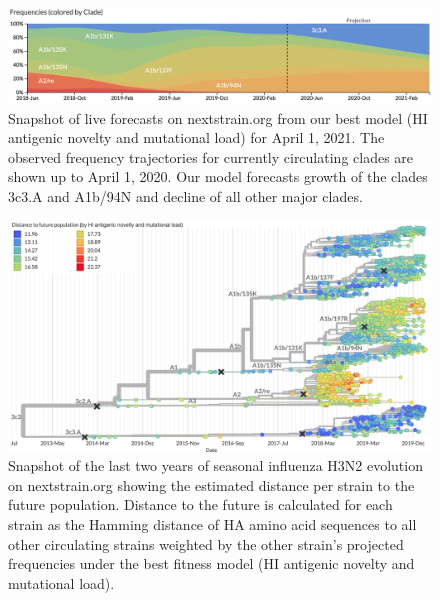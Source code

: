 \documentclass[9pt,lineno]{elife} %
\providecommand{\DIFaddbeginFL}{} %
\providecommand{\DIFaddendFL}{} %
\providecommand{\DIFdelbeginFL}{} %
\providecommand{\DIFdelendFL}{} %
\providecommand{\DIFaddbeginFL}{} %
\providecommand{\DIFaddendFL}{} %
\providecommand{\DIFdelbeginFL}{} %
\providecommand{\DIFdelendFL}{} %
\newcommand{\DIFscaledelfig}{0.5}
\newlength{\DIFdelgraphicswidth} %
\newlength{\DIFdelgraphicsheight} %
\newcommand{\DIFaddincludegraphics}[2][]{{\color{blue}\fbox{\DIFOincludegraphics[#1]{#2}}}} %
\newcommand{\DIFdelincludegraphics}[2][]{%
\sbox{\DIFdelgraphicsbox}{\DIFOincludegraphics[#1]{#2}}%
\settoboxwidth{\DIFdelgraphicswidth}{\DIFdelgraphicsbox} %
\settoboxtotalheight{\DIFdelgraphicsheight}{\DIFdelgraphicsbox} %
\scalebox{\DIFscaledelfig}{%
\parbox[b]{\DIFdelgraphicswidth}{\usebox{\DIFdelgraphicsbox}\\[-\baselineskip] \rule{\DIFdelgraphicswidth}{0em}}\llap{\resizebox{\DIFdelgraphicswidth}{\DIFdelgraphicsheight}{%
\setlength{\unitlength}{\DIFdelgraphicswidth}%
\begin{picture}(1,1)%
\thicklines\linethickness{2pt} %
{\color[rgb]{1,0,0}\put(0,0){\framebox(1,1){}}}%
{\color[rgb]{1,0,0}\put(0,0){\line( 1,1){1}}}%
{\color[rgb]{1,0,0}\put(0,1){\line(1,-1){1}}}%
\end{picture}%
}\hspace*{3pt}}} %
} %
\DeclareRobustCommand{\DIFaddbeginFL}{\DIFOaddbeginFL \let\includegraphics\DIFaddincludegraphics} %
\DeclareRobustCommand{\DIFaddendFL}{\DIFOaddendFL \let\includegraphics\DIFOincludegraphics} %
\DeclareRobustCommand{\DIFdelbeginFL}{\DIFOdelbeginFL \let\includegraphics\DIFdelincludegraphics} %
\DeclareRobustCommand{\DIFdelendFL}{\DIFOaddendFL \let\includegraphics\DIFOincludegraphics} %
\begin{document}
\begin{figure}[htb]
  \begin{center}
  \DIFdelbeginFL %
\DIFdelendFL \DIFaddbeginFL \includegraphics[width=\textwidth]{Figure_9.png}
  \DIFaddendFL \caption{
    Snapshot of live forecasts on nextstrain.org from our best model (HI antigenic novelty and mutational load) for April 1, 2021.
    The observed frequency trajectories for currently circulating clades are shown up to April 1, 2020.
    Our model forecasts growth of the clades 3c3.A and A1b/94N and decline of all other major clades.
  }
  \label{fig:nextstrain_forecasts}
  \end{center}
\end{figure}

\begin{figure}[htb]
  \begin{center}
  \DIFdelbeginFL %
\DIFdelendFL \DIFaddbeginFL \includegraphics[width=\textwidth]{Figure_10.png}
  \DIFaddendFL \caption{
    Snapshot of the last two years of seasonal influenza H3N2 evolution on nextstrain.org showing the estimated distance per strain to the future population.
    Distance to the future is calculated for each strain as the Hamming distance of HA amino acid sequences to all other circulating strains weighted by the other strain's projected frequencies under the best fitness model (HI antigenic novelty and mutational load).
  }
  \label{fig:nextstrain_distance_to_future}
  \end{center}
\end{figure}
\end{document}
